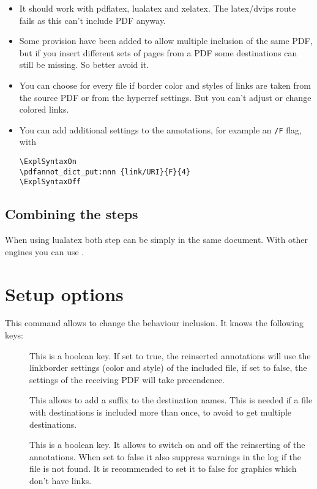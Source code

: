 \documentclass[DIV=12,parskip=half-,bibliography=totoc]{scrartcl}
\begin{document}
\begin{itemize}
\item It should work with pdflatex, lualatex and xelatex. The latex/dvips route fails as this can't include PDF anyway.
\item Some provision have been added to allow multiple inclusion of the same PDF, but if you insert different sets of pages from a PDF some destinations can still be missing. So better avoid it.
\item You can choose for every file if border color and styles of links are taken from the source PDF or from the hyperref settings. But you can't adjust or change colored links.
\item You can add additional settings to the annotations, for example an \texttt{/F} flag, with

\begin{lstlisting}
\ExplSyntaxOn
\pdfannot_dict_put:nnn {link/URI}{F}{4}
\ExplSyntaxOff
\end{lstlisting}

\end{itemize}



\subsection{Combining the steps}

When using lualatex both step can be simply in the same document.
With other engines you can use .



\section{Setup options}

\DescribeMacro{}

This command allows to change the behaviour inclusion. It knows the following keys:

\begin{description}
  \item[] This is a boolean key. If set to true, the reinserted annotations will use the linkborder settings (color and style) of the included file, if set to false, the settings of the receiving PDF will take precendence.

  \item[] This allows to add a suffix to the destination names. This is needed if a file with destinations
  is included more than once, to avoid to get multiple destinations.

 \item[] This is a boolean key. It allows to switch on and off the reinserting of the annotations. When set to false  it also suppress warnings in the log if the  file is not found.
     It is recommended to set it to false for graphics which don't have links.

\end{description}
\end{document}
